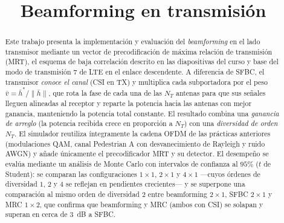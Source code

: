 \documentclass[conference,onecolumn]{IEEEtran}
\begin{document}
\title{Beamforming en transmisi\'on}

\author{
\and
{}
}

\maketitle

\begin{abstract}
Este trabajo presenta la implementaci\'on y evaluaci\'on del \textit{beamforming} en el lado transmisor mediante un vector de precodificaci\'on de m\'axima relaci\'on de transmisi\'on (MRT), el esquema de baja correlaci\'on descrito en las diapositivas del curso \cite{vazquez_cmoviles} y base del modo de transmisi\'on 7 de LTE en el enlace descendente. A diferencia de SFBC, el transmisor \emph{conoce el canal} (CSI en TX) y multiplica cada subportadora por el peso $\bar{v}=\bar{h}^{*}/\|\bar{h}\|$, que rota la fase de cada una de las $N_T$ antenas para que sus se\~nales lleguen alineadas al receptor y reparte la potencia hacia las antenas con mejor ganancia, manteniendo la potencia total constante. El resultado combina una \emph{ganancia de arreglo} (la potencia recibida crece en proporci\'on a $N_T$) con una \emph{diversidad de orden $N_T$}. El simulador reutiliza \'integramente la cadena OFDM de las pr\'acticas anteriores (modulaciones QAM, canal Pedestrian A con desvanecimiento de Rayleigh y ruido AWGN) y a\~nade \'unicamente el precodificador MRT y su detector. El desempe\~no se eval\'ua mediante un an\'alisis de Monte Carlo con intervalos de confianza al $95\%$ ($t$ de Student): se comparan las configuraciones $1\times1$, $2\times1$ y $4\times1$ ---cuyos \'ordenes de diversidad $1$, $2$ y $4$ se reflejan en pendientes crecientes--- y se superpone una comparaci\'on al mismo orden de diversidad $2$ entre beamforming $2\times1$, SFBC $2\times1$ y MRC $1\times2$, que confirma que beamforming y MRC (ambos con CSI) se solapan y superan en cerca de $3$~dB a SFBC.
\end{abstract}
\end{document}
